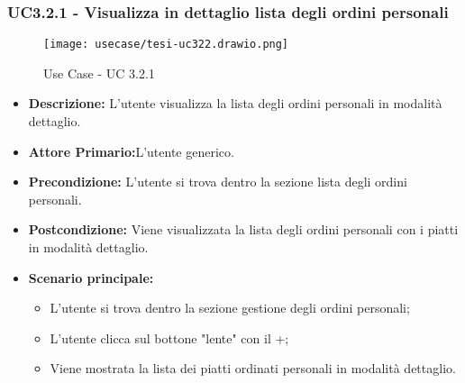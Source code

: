 \subsubsection{UC3.2.1 - Visualizza in dettaglio lista degli ordini personali}
\begin{figure}[H]
    \centering
    \texttt{[image: usecase/tesi-uc322.drawio.png]}
    \caption{Use Case - UC 3.2.1}
\end{figure}
\begin{itemize}
    \item \textbf{Descrizione:} L'utente visualizza la lista degli ordini personali in modalità dettaglio.
    \item \textbf{Attore Primario:}L'utente generico.
    \item \textbf{Precondizione:} L'utente si trova dentro la sezione lista degli ordini personali.
    \item \textbf{Postcondizione:} Viene visualizzata la lista degli ordini personali con i piatti in modalità dettaglio.
    \item \textbf{Scenario principale:}
    \begin{itemize}
        \item L'utente si trova dentro la sezione gestione degli ordini personali;
        \item L'utente clicca sul bottone "lente" con il +;
        \item Viene mostrata la lista dei piatti ordinati personali in modalità dettaglio.
    \end{itemize}
\end{itemize}
